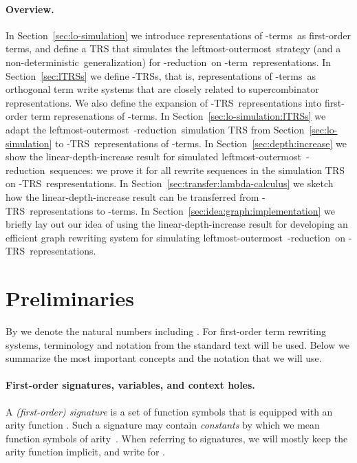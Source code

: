 \documentclass[
submission
]{dmtcs-episciences-tampered}
\newcommand{\nb}{\nobreakdash}
\newcommand{\TRS}{TRS}
\newcommand{\lambdaterm}{\nb-term}
\newcommand{\lambdaterms}{\lambdaterm{s}}
\newcommand{\betareduction}{\nb-re\-duc\-tion}
\newcommand{\lo}{left\-most-outer\-most}
\newcommand{\nondeterministic}{non-de\-ter\-min\-istic}
\newcommand{\lTRS}{\hspace*{-0.5pt}\nb-\hspace*{-0.5pt}\TRS}
\newcommand{\lTRSs}{\lTRS{s}}
\theoremstyle{plain}
\theoremstyle{definition}
\begin{document}
\paragraph{Overview.}
  In Section~\ref{sec:lo-simulation}
    we introduce representations of \lambdaterms\ as first-order terms,
    and define a TRS that simulates the \lo\ strategy 
    (and a \nondeterministic\ generalization) for \betareduction\ 
on \lambdaterm\ representations. 
  In Section~\ref{sec:lTRSs} 
    we define \lTRSs, that is, representations of \lambdaterms\ as orthogonal term write systems
    that are closely related to supercombinator representations.
    We also define the expansion of \lTRS\ representations into first-order term represenations of \lambdaterms.
  In Section~\ref{sec:lo-simulation:lTRSs}
    we adapt the \lo\ \betareduction\ simulation TRS from Section~\ref{sec:lo-simulation} 
    to \lTRS\ representations of \lambdaterms.  
  In Section~\ref{sec:depth:increase}
    we show the linear-depth-increase result for simulated \lo\ \betareduction\ sequences:
    we prove it for all rewrite sequences in the simulation TRS on \lTRS\ respresentations.
  In Section~\ref{sec:transfer:lambda-calculus}
    we sketch how the linear-depth-increase result can be transferred from \lTRS\ representations to \lambdaterms.
  In Section~\ref{sec:idea:graph:implementation}
    we briefly lay out our idea of using the linear-depth-increase result 
    for developing an efficient graph rewriting system
    for simulating \lo\ \betareduction\ on \lTRS\ representations.


\section{Preliminaries}
  \label{prelims}


By  we denote the natural numbers including .
For first-order term rewriting systems, terminology and notation from the standard text \cite{terese:2003} will be used.
Below we summarize the most important concepts and the notation that we will use. 

\paragraph{First-order signatures, variables, and context holes.}
  A \emph{(first-order) signature}  is a set of function symbols that is equipped with an arity function . 
  Such a signature may contain \emph{constants} by which we mean function symbols of arity~. 
  When referring to signatures, we will mostly keep the arity function implicit, and write  for . 
  
\end{document}

